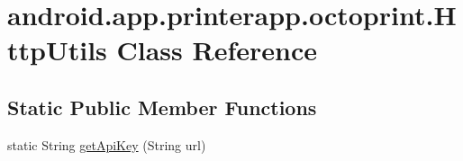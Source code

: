 \hypertarget{classandroid_1_1app_1_1printerapp_1_1octoprint_1_1_http_utils}{}\section{android.\+app.\+printerapp.\+octoprint.\+Http\+Utils Class Reference}
\label{classandroid_1_1app_1_1printerapp_1_1octoprint_1_1_http_utils}
\subsection*{Static Public Member Functions}
\begin{DoxyCompactItemize}
\item 
static String \hyperlink{classandroid_1_1app_1_1printerapp_1_1octoprint_1_1_http_utils_ad9756103b6435d2422de884247179bbd}{get\+Api\+Key} (String url)
\end{DoxyCompactItemize}
